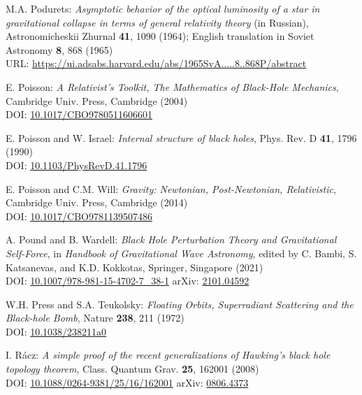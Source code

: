 \begin{thebibliography}{123}
M.A. Podurets:
{\em Asymptotic behavior of the optical luminosity of a star in gravitational collapse
in terms of general relativity theory}
(in Russian),
Astronomicheskii Zhurnal {\bf 41}, 1090 (1964);
English translation in Soviet Astronomy {\bf 8}, 868 (1965)\\
URL: \url{https://ui.adsabs.harvard.edu/abs/1965SvA.....8..868P/abstract}

E. Poisson: \emph{A Relativist's Toolkit,
The Mathematics of Black-Hole Mechanics},
Cambridge Univ. Press, Cambridge (2004) \\
DOI: \href{https://doi.org/10.1017/CBO9780511606601}{10.1017/CBO9780511606601}

E. Poisson and W. Israel: {\em Internal structure of black holes},
Phys. Rev. D {\bf 41}, 1796 (1990) \\
DOI: \href{https://doi.org/10.1103/PhysRevD.41.1796}{10.1103/PhysRevD.41.1796}

E. Poisson and C.M. Will: {\em Gravity: Newtonian, Post-Newtonian, Relativistic},
Cambridge Univ. Press, Cambridge (2014) \\
DOI: \href{https://doi.org/10.1017/CBO9781139507486}{10.1017/CBO9781139507486}

A. Pound and B. Wardell:
{\em Black Hole Perturbation Theory and Gravitational Self-Force},
in {\em Handbook of Gravitational Wave Astronomy}, edited by
C. Bambi, S. Katsanevas, and K.D. Kokkotas,
Springer, Singapore (2021)\\
DOI: \href{https://doi.org/10.1007/978-981-15-4702-7_38-1}{10.1007/978-981-15-4702-7\_38-1}\hfill
arXiv: \href{https://arxiv.org/abs/2101.04592}{2101.04592}

W.H. Press and S.A. Teukolsky:
{\em Floating Orbits, Superradiant Scattering and the Black-hole Bomb},
Nature {\bf 238}, 211 (1972)\\
DOI: \href{https://doi.org/10.1038/238211a0}{10.1038/238211a0}

I. R\'acz:
{\em A simple proof of the recent generalizations of Hawking's black hole topology theorem},
Class. Quantum Grav. {\bf 25}, 162001 (2008)\\
DOI: \href{https://doi.org/10.1088/0264-9381/25/16/162001}{10.1088/0264-9381/25/16/162001}\hfill
arXiv: \href{https://arxiv.org/abs/0806.4373}{0806.4373}


\end{thebibliography}
